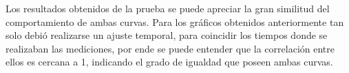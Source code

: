 \documentclass[12pt,a4paper]{article}
\begin{document}
	Los resultados obtenidos de la prueba se puede apreciar la gran similitud del comportamiento de ambas curvas.
	Para los gráficos obtenidos anteriormente tan solo debió realizarse un ajuste temporal, para coincidir los tiempos donde se realizaban las mediciones, por ende se puede entender que la correlación entre ellos es cercana a 1, indicando el grado de igualdad que poseen ambas curvas.
	

\end{document}
